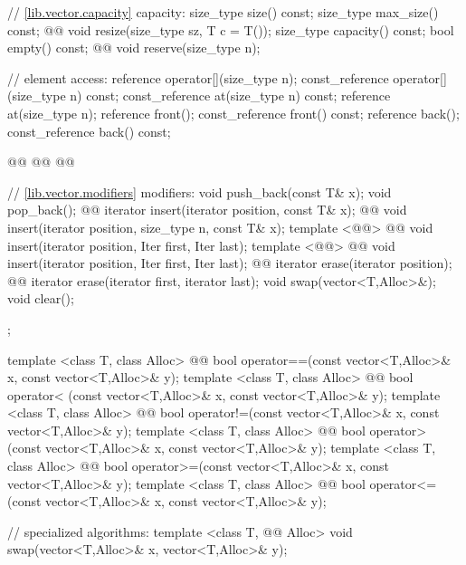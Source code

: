 \documentclass[american,twoside]{book}
\begin{document}
\begin{codeblock}
{{    // \ref{lib.vector.capacity} capacity:
    size_type size() const;
    size_type max_size() const;
    @@ void resize(size_type sz, T c = T());
    size_type capacity() const;
    bool      empty() const;
    @@ void reserve(size_type n);

    // element access:
    reference       operator[](size_type n);
    const_reference operator[](size_type n) const;
    const_reference at(size_type n) const;
    reference       at(size_type n);
    reference       front();
    const_reference front() const;
    reference       back();
    const_reference back() const;

    @@
    @@
    @@

    // \ref{lib.vector.modifiers} modifiers:
    void push_back(const T& x);
    void pop_back();
    @@ 
      iterator insert(iterator position, const T& x);
    @@ 
      void insert(iterator position, size_type n, const T& x);
    template <@@>
      @@
      void insert(iterator position, Iter first, Iter last);
    template <@@>
      @@
      void insert(iterator position, Iter first, Iter last);
    @@ iterator erase(iterator position);
    @@ iterator erase(iterator first, iterator last);
    void     swap(vector<T,Alloc>&);
    void     clear();
  };

  template <class T, class Alloc>
    @@
    bool operator==(const vector<T,Alloc>& x,
                    const vector<T,Alloc>& y);
  template <class T, class Alloc>
    @@
    bool operator< (const vector<T,Alloc>& x,
                    const vector<T,Alloc>& y);
  template <class T, class Alloc>
    @@
    bool operator!=(const vector<T,Alloc>& x,
                    const vector<T,Alloc>& y);
  template <class T, class Alloc>
    @@
    bool operator> (const vector<T,Alloc>& x,
                    const vector<T,Alloc>& y);
  template <class T, class Alloc>
    @@
    bool operator>=(const vector<T,Alloc>& x,
                    const vector<T,Alloc>& y);
  template <class T, class Alloc>
    @@
    bool operator<=(const vector<T,Alloc>& x,
                    const vector<T,Alloc>& y);

  // specialized algorithms:
  template <class T, @@ Alloc>
    void swap(vector<T,Alloc>& x, vector<T,Alloc>& y);
}
\end{codeblock}%
\end{document}

